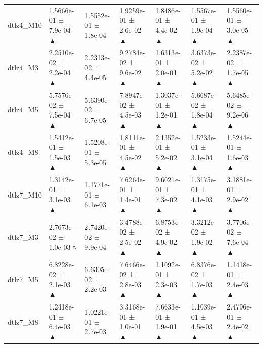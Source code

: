 \begin{tabular}{lllllll}
dtlz4\_M10 & 1.5666e-01 ± 7.9e-04 ▲ & 1.5552e-01 ± 1.8e-04 & 1.9259e-01 ± 2.6e-02 ▲ & 1.8486e-01 ± 4.4e-02 ▲ & 1.5567e-01 ± 1.9e-04 ▲ & 1.5560e-01 ± 3.0e-05 ▲ \\
dtlz4\_M3 & 2.2510e-02 ± 2.2e-04 ▲ & 2.2313e-02 ± 4.4e-05 & 9.2784e-02 ± 9.6e-02 ▲ & 1.6313e-01 ± 2.0e-01 ▲ & 3.6373e-02 ± 5.2e-02 ▲ & 2.2387e-02 ± 1.7e-05 ▲ \\
dtlz4\_M5 & 5.7576e-02 ± 7.5e-04 ▲ & 5.6390e-02 ± 6.7e-05 & 7.8947e-02 ± 4.5e-03 ▲ & 1.3037e-01 ± 1.2e-01 ▲ & 5.6687e-02 ± 1.8e-04 ▲ & 5.6485e-02 ± 9.2e-06 ▲ \\
dtlz4\_M8 & 1.5412e-01 ± 1.5e-03 ▲ & 1.5208e-01 ± 5.3e-05 & 1.8111e-01 ± 4.5e-02 ▲ & 2.1352e-01 ± 5.2e-02 ▲ & 1.5233e-01 ± 3.1e-04 ▲ & 1.5244e-01 ± 1.6e-03 ▲ \\
dtlz7\_M10 & 1.3142e-01 ± 3.1e-03 ▲ & 1.1771e-01 ± 6.1e-03 & 7.6264e-01 ± 1.4e-01 ▲ & 9.6021e-01 ± 7.3e-02 ▲ & 1.3175e-01 ± 4.1e-03 ▲ & 3.1881e-01 ± 2.9e-02 ▲ \\
dtlz7\_M3 & 2.7673e-02 ± 1.0e-03 ≈ & 2.7420e-02 ± 9.9e-04 & 3.4788e-02 ± 2.5e-02 ▲ & 6.8753e-02 ± 4.9e-02 ▲ & 3.3212e-02 ± 1.9e-02 ▲ & 3.7706e-02 ± 7.6e-04 ▲ \\
dtlz7\_M5 & 6.8228e-02 ± 2.1e-03 ▲ & 6.6305e-02 ± 2.2e-03 & 7.6466e-02 ± 2.8e-03 ▲ & 1.1092e-01 ± 2.3e-03 ▲ & 6.8376e-02 ± 1.7e-03 ▲ & 1.1418e-01 ± 2.4e-03 ▲ \\
dtlz7\_M8 & 1.2418e-01 ± 6.4e-03 ▲ & 1.0221e-01 ± 2.7e-03 & 3.3168e-01 ± 1.0e-01 ▲ & 7.6633e-01 ± 1.9e-01 ▲ & 1.1039e-01 ± 4.5e-03 ▲ & 2.4796e-01 ± 2.4e-02 ▲ \\
\bottomrule
\end{tabular}
